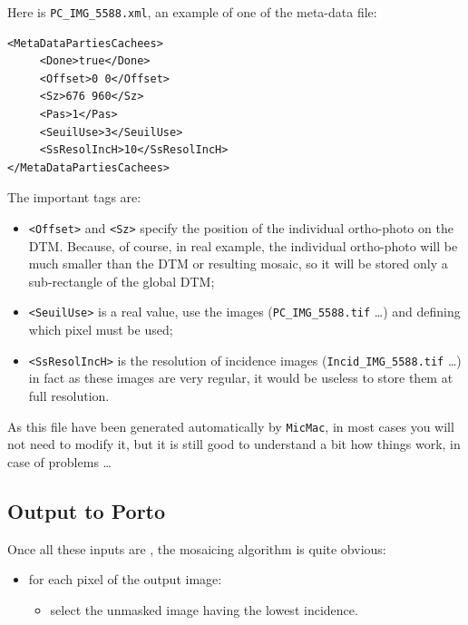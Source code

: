 Here is {\tt PC\_IMG\_5588.xml}, an example of one of the meta-data file:


{\scriptsize
\begin{verbatim}
<MetaDataPartiesCachees>
     <Done>true</Done>
     <Offset>0 0</Offset>
     <Sz>676 960</Sz>
     <Pas>1</Pas>
     <SeuilUse>3</SeuilUse>
     <SsResolIncH>10</SsResolIncH>
</MetaDataPartiesCachees>
\end{verbatim}
}

The important tags are:

\begin{itemize}
   \item {\tt <Offset>} and {\tt <Sz>} specify the position of the individual ortho-photo
         on the DTM. Because, of course, in real example, the individual ortho-photo  will be much smaller
         than the DTM or resulting mosaic, so it will be stored only a sub-rectangle of the global DTM;

   \item {\tt <SeuilUse>} is a real value, use  the  images ({\tt PC\_IMG\_5588.tif} \dots) and
         defining which pixel must be used;

   \item {\tt <SsResolIncH>} is the resolution of incidence images ({\tt Incid\_IMG\_5588.tif} \dots)
         in fact as these images are very regular, it would be useless to store them at full resolution.

\end{itemize}


As this file have been generated automatically by {\tt MicMac}, in most cases you will
not need to modify it, but it is still good to understand a bit how things work,
in case of problems \dots



\subsection{Output to Porto}

Once  all these inputs are , %
the mosaicing
algorithm is quite obvious:

\begin{itemize}
     \item for each pixel of  the output image:
     \begin{itemize}
          \item select the unmasked image having the lowest incidence.
     \end{itemize}
\end{itemize}


